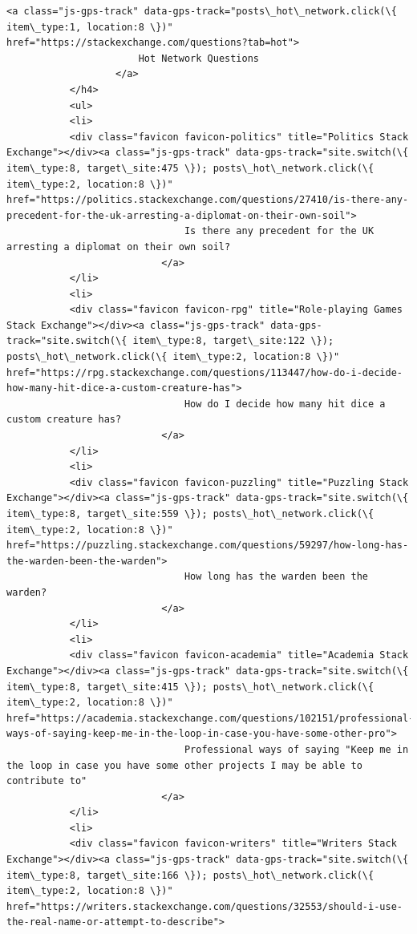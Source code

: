 \documentclass[11pt]{article}
\begin{document}
\begin{Verbatim}[commandchars=\\\{\}]
           <a class="js-gps-track" data-gps-track="posts\_hot\_network.click(\{ item\_type:1, location:8 \})" href="https://stackexchange.com/questions?tab=hot">
                       Hot Network Questions
                   </a>
           </h4>
           <ul>
           <li>
           <div class="favicon favicon-politics" title="Politics Stack Exchange"></div><a class="js-gps-track" data-gps-track="site.switch(\{ item\_type:8, target\_site:475 \}); posts\_hot\_network.click(\{ item\_type:2, location:8 \})" href="https://politics.stackexchange.com/questions/27410/is-there-any-precedent-for-the-uk-arresting-a-diplomat-on-their-own-soil">
                               Is there any precedent for the UK arresting a diplomat on their own soil?
                           </a>
           </li>
           <li>
           <div class="favicon favicon-rpg" title="Role-playing Games Stack Exchange"></div><a class="js-gps-track" data-gps-track="site.switch(\{ item\_type:8, target\_site:122 \}); posts\_hot\_network.click(\{ item\_type:2, location:8 \})" href="https://rpg.stackexchange.com/questions/113447/how-do-i-decide-how-many-hit-dice-a-custom-creature-has">
                               How do I decide how many hit dice a custom creature has?
                           </a>
           </li>
           <li>
           <div class="favicon favicon-puzzling" title="Puzzling Stack Exchange"></div><a class="js-gps-track" data-gps-track="site.switch(\{ item\_type:8, target\_site:559 \}); posts\_hot\_network.click(\{ item\_type:2, location:8 \})" href="https://puzzling.stackexchange.com/questions/59297/how-long-has-the-warden-been-the-warden">
                               How long has the warden been the warden?
                           </a>
           </li>
           <li>
           <div class="favicon favicon-academia" title="Academia Stack Exchange"></div><a class="js-gps-track" data-gps-track="site.switch(\{ item\_type:8, target\_site:415 \}); posts\_hot\_network.click(\{ item\_type:2, location:8 \})" href="https://academia.stackexchange.com/questions/102151/professional-ways-of-saying-keep-me-in-the-loop-in-case-you-have-some-other-pro">
                               Professional ways of saying "Keep me in the loop in case you have some other projects I may be able to contribute to"
                           </a>
           </li>
           <li>
           <div class="favicon favicon-writers" title="Writers Stack Exchange"></div><a class="js-gps-track" data-gps-track="site.switch(\{ item\_type:8, target\_site:166 \}); posts\_hot\_network.click(\{ item\_type:2, location:8 \})" href="https://writers.stackexchange.com/questions/32553/should-i-use-the-real-name-or-attempt-to-describe">

\end{Verbatim}
\end{document}
